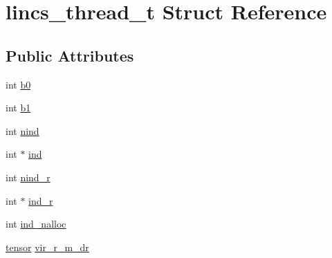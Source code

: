 \hypertarget{structlincs__thread__t}{\section{lincs\-\_\-thread\-\_\-t \-Struct \-Reference}
\label{structlincs__thread__t}
}
\subsection*{\-Public \-Attributes}
\begin{DoxyCompactItemize}
\item 
int \hyperlink{structlincs__thread__t_acd5a6c85306dcd71344d4a2afcedeca5}{b0}
\item 
int \hyperlink{structlincs__thread__t_adb9ecb99a3586f8d0cbce27cf199046f}{b1}
\item 
int \hyperlink{structlincs__thread__t_aad1b302849b981111129d04497119596}{nind}
\item 
int $\ast$ \hyperlink{structlincs__thread__t_a5f3504040a144e1ae1334236b596446d}{ind}
\item 
int \hyperlink{structlincs__thread__t_a44ceb421605a59ae6db362e8d49128fc}{nind\-\_\-r}
\item 
int $\ast$ \hyperlink{structlincs__thread__t_a81a42aca24c5e27a3ce6c1fe1cfc1843}{ind\-\_\-r}
\item 
int \hyperlink{structlincs__thread__t_a22e5bdea5f89c186bb1af256e97115d6}{ind\-\_\-nalloc}
\item 
\hyperlink{share_2template_2gromacs_2types_2simple_8h_aef0bf341f56ce75f09dbb64350488a61}{tensor} \hyperlink{structlincs__thread__t_ad551562ec265846710f49720eeabc084}{vir\-\_\-r\-\_\-m\-\_\-dr}
\end{DoxyCompactItemize}


